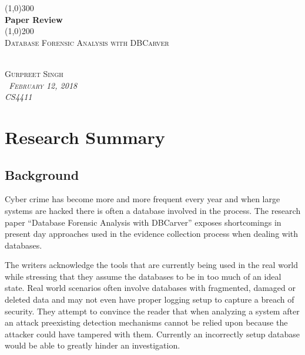 \documentclass[11pt,]{article}
\begin{document}
\doublespacing

\begin{titlepage}
    \begin{center}
    \line(1,0){300} \\ 
    [0.25in]
    \huge{\bfseries Paper Review} \\
    [2mm]
    \line(1,0){200} \\
    [1.5cm] 
    \textsc{\Large Database Forensic Analysis with DBCarver} \\
    [0.75cm]
    \textsc{\Large } \\
    [9cm]
    \end{center}
    
    \begin{flushright}
    \textsc{\Large{Gurpreet Singh \\}\normalsize\emph{\ February 12, 2018 \\}\normalsize\emph{CS4411 \\} }
    
    \end{flushright}
    
\end{titlepage}

\newpage

\hypertarget{research-summary}{%
\section{Research Summary}\label{research-summary}}

\hypertarget{background}{%
\subsection{Background}\label{background}}

Cyber crime has become more and more frequent every year and when large
systems are hacked there is often a database involved in the process.
The research paper ``Database Forensic Analysis with DBCarver'' exposes
shortcomings in present day approaches used in the evidence collection
process when dealing with databases. \textcite{thearticle}

The writers acknowledge the tools that are currently being used in the
real world while stressing that they assume the databases to be in too
much of an ideal state. Real world scenarios often involve databases
with fragmented, damaged or deleted data and may not even have proper
logging setup to capture a breach of security. They attempt to convince
the reader that when analyzing a system after an attack preexisting
detection mechanisms cannot be relied upon because the attacker could
have tampered with them. Currently an incorrectly setup database would
be able to greatly hinder an investigation.
\end{document}
